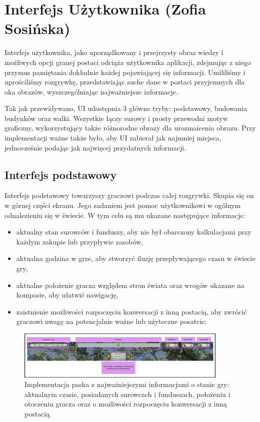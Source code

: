 \section{Interfejs Użytkownika (Zofia Sosińska)}\label{chap:ui_imp}
Interfejs użytkownika, jako uporządkowany i przejrzysty obraz wiedzy i możliwych opcji granej postaci odciąża użytkownika
aplikacji, zdejmując z niego przymus pamiętania dokładnie każdej pojawiającej się informacji. Umililiśmy i uprościliśmy 
rozgrywkę, przedstawiając suche dane w postaci przyjemnych dla oka obrazów, wyszczególniając najważniejsze informacje.

Tak jak przewidywano, UI udostępnia 3 główne tryby: podstawowy, budowania budynków oraz walki. Wszystkie łączy surowy 
i prosty przewodni motyw graficzny, wykorzystujący także różnorodne obrazy dla urozmaicenia obrazu. Przy implementacji ważne także było, aby UI zabierał jak najmniej miejsca, jednocześnie podając jak 
najwięcej przydatnych informacji.

\subsection{Interfejs podstawowy}
Interfejs podstawowy towarzyszy graczowi podczas całej rozgrywki. Skupia się on w górnej części ekranu. Jego zadaniem jest pomoc 
użytkownikowi w ogólnym odnalezieniu się w świecie. W tym celu są mu ukazane następujące informacje:
\begin{itemize}
    \item aktualny stan surowców i funduszy, aby nie był obarczony kalkulacjami przy każdym zakupie lub przypływie zasobów,
    \item aktualna godzina w grze, aby stworzyć iluzję przepływającego czasu w świecie gry,
    \item aktualne położenie gracza względem stron świata oraz wrogów ukazane na kompasie, aby ułatwić nawigację,
    \item zaistnienie możliwości rozpoczęciu konwersacji z inną postacią, aby zwrócić graczowi uwagę na potencjalnie ważne lub użyteczne posatcie;
\end{itemize}

\begin{figure}[htbp]
    \centering
    \includegraphics[width=0.9\textwidth]{images/ui/naszpasek.png}
    \caption{Implementacja paska z najważniejszymi informacjami o stanie gry: aktualnym czasie, posiadanych surowcach 
    i funduszach, położeniu i otoczeniu gracza oraz o możliwości rozpoczęciu konwersacji z inną postacią.
    }\label{fig:compass}
\end{figure}


